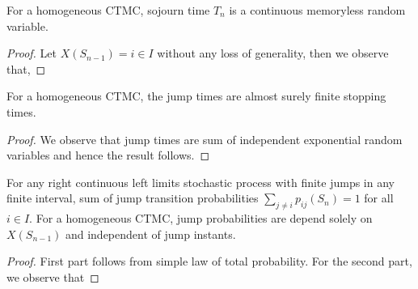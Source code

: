 \documentclass[a4paper,10pt,english]{article}
\begin{document}
\begin{lem}\label{Lemma:MemorylessSojourn}
For a homogeneous CTMC, sojourn time $T_n$ is a continuous memoryless random variable. %
\end{lem}
\begin{proof}
Let $X(S_{n-1}) = i \in I$ without any loss of generality, then we observe that,
\end{proof}
\begin{cor} 
For a homogeneous CTMC, the jump times are almost surely finite stopping times. 
\end{cor}
\begin{proof}
We observe that jump times are sum of independent exponential random variables and hence the result follows. 
\end{proof}
\begin{lem}\label{Lemma:JumpProb}
For any right continuous left limits stochastic process with finite jumps in any finite interval, sum of jump transition probabilities $\sum_{j \neq i}p_{ij}(S_n) = 1$ for all $i \in I$. 
For a homogeneous CTMC, jump probabilities are depend solely on $X(S_{n-1})$ and independent of jump instants.  
\end{lem}
\begin{proof}
First part follows from simple law of total probability. 
For the second part, we observe that 
\end{proof}

\end{document}
